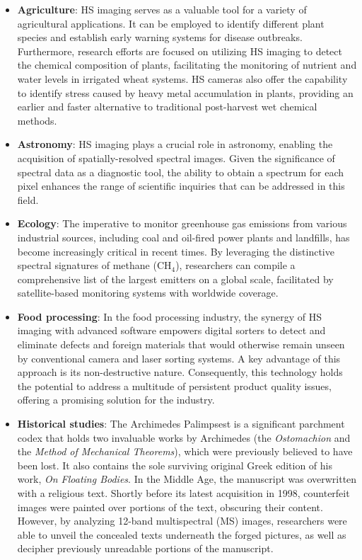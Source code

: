 \begin{itemize}
    \item \textbf{Agriculture}: HS imaging serves as a valuable tool for a variety of agricultural applications.
    It can be employed to identify different plant species and establish early warning systems for disease outbreaks.
    Furthermore, research efforts are focused on utilizing HS imaging to detect the chemical composition of plants, facilitating the monitoring of nutrient and water levels in irrigated wheat systems.
    HS cameras also offer the capability to identify stress caused by heavy metal accumulation in plants, providing an earlier and faster alternative to traditional post-harvest wet chemical methods.
    
    \item \textbf{Astronomy}: HS imaging plays a crucial role in astronomy, enabling the acquisition of spatially-resolved spectral images.
    Given the significance of spectral data as a diagnostic tool, the ability to obtain a spectrum for each pixel enhances the range of scientific inquiries that can be addressed in this field.
    
    \item \textbf{Ecology}: The imperative to monitor greenhouse gas emissions from various industrial sources, including coal and oil-fired power plants and landfills, has become increasingly critical in recent times.
    By leveraging the distinctive spectral signatures of methane ($\text{CH}_4$), researchers can compile a comprehensive list of the largest emitters on a global scale, facilitated by satellite-based monitoring systems with worldwide coverage.
    
    \item \textbf{Food processing}: In the food processing industry, the synergy of HS imaging with advanced software empowers digital sorters to detect and eliminate defects and foreign materials that would otherwise remain unseen by conventional camera and laser sorting systems.
    A key advantage of this approach is its non-destructive nature.
    Consequently, this technology holds the potential to address a multitude of persistent product quality issues, offering a promising solution for the industry.
    
    \item \textbf{Historical studies}: The Archimedes Palimpsest is a significant parchment codex that holds two invaluable works by Archimedes (the \emph{Ostomachion} and the \emph{Method of Mechanical Theorems}), which were previously believed to have been lost.
    It also contains the sole surviving original Greek edition of his work, \emph{On Floating Bodies}.
    In the Middle Age, the manuscript was overwritten with a religious text.
    Shortly before its latest acquisition in 1998, counterfeit images were painted over portions of the text, obscuring their content.
    However, by analyzing 12-band multispectral (MS) images, researchers were able to unveil the concealed texts underneath the forged pictures, as well as decipher previously unreadable portions of the manuscript.
    

\end{itemize}
